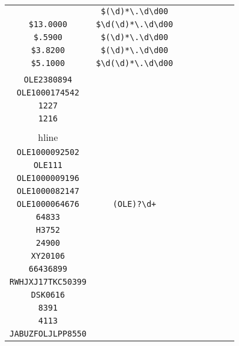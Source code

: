 \begin{longtable}{cccccccc}
\begin{tabular}{ll}
    \verb|$1.3700| & \verb|$(\d)*\.\d\d00|\\
\verb|$13.0000| & \verb|$\d(\d)*\.\d\d00|\\
\verb|$.5900| & \verb|$(\d)*\.\d\d00|\\
\verb|$3.8200| & \verb|$(\d)*\.\d\d00|\\
\verb|$5.1000| & \verb|$\d(\d)*\.\d\d00|
\end{tabular}
\\\midrule 
\begin{tabular}{l}
    \verb|OLE10026|\\
\verb|OLE2380894|\\
\verb|OLE1000174542|\\
\verb|1227|\\
\verb|1216|\\
\\hline\\
\verb|OLE1000092502|\\
\verb|OLE111|\\
\verb|OLE1000009196|\\
\verb|OLE1000082147|\\
\verb|OLE1000064676|
\end{tabular}

&
\verb|(OLE)?\d+|
&

\begin{tabular}{l}
    \verb|(\u)*(\d)*\d\d\d\d|\\
\verb|64833|\\
\verb|H3752|\\
\verb|24900|\\
\verb|XY20106|\\
\verb|66436899|
\end{tabular}

&

\begin{tabular}{l}
    \verb|(\u\u\u(\d)*)*\d\d\d\d|\\
\verb|RWHJXJ17TKC50399|\\
\verb|DSK0616|\\
\verb|8391|\\
\verb|4113|\\
\verb|JABUZFOLJLPP8550|
\end{tabular}

&


\end{longtable}
